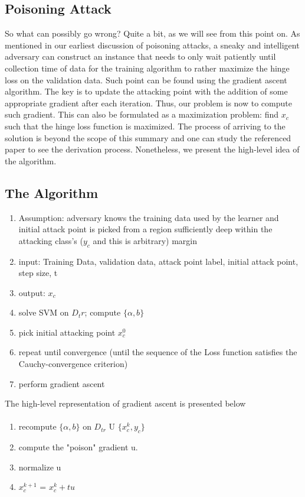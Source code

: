 \documentclass{article}
\begin{document}
\subsection{Poisoning Attack}
So what can possibly go wrong? Quite a bit, as we will see from this point on. As mentioned in our earliest discussion of poisoning attacks, a sneaky and intelligent adversary can construct an instance that needs to only wait patiently until collection time of data for the training algorithm to rather maximize the hinge loss on the validation data. Such point can be found using the gradient ascent algorithm. The key is to update the attacking point with the addition of some appropriate gradient after each iteration. Thus, our problem is now to compute such gradient. This can also be formulated as a maximization problem: find $x_c$ such that the hinge loss function is maximized. The process of arriving to the solution is beyond the scope of this summary and one can study the referenced paper to see the derivation process. Nonetheless, we present the high-level idea of the algorithm.
\subsection{The Algorithm}
\begin{enumerate}
  \item Assumption: adversary knows the training data used by the learner and initial attack point is picked from a region sufficiently deep within the attacking class's ($y_c$ and this is arbitrary) margin
  \item input: Training Data, validation data, attack point label, initial attack point, step size, t
  \item output: $x_c$
  \item solve SVM on $D_tr$; compute $\{\alpha, b\}$
  \item pick initial attacking point $x_c^{0}$
  \item repeat until convergence (until the sequence of the Loss function satisfies the Cauchy-convergence criterion)
  \item perform gradient ascent 
\end{enumerate}

The high-level representation of gradient ascent is presented below
\paragraph{}
\begin{enumerate}
    \item recompute $\{\alpha, b\}$ on $D_{tr}$ U $\{x_c^{k}, y_c\}$
    \item compute the "poison" gradient u.
    \item normalize u
    \item $x_c^{k+1}$ = $x_c^{k} + tu$
\end{enumerate}
\end{document}
